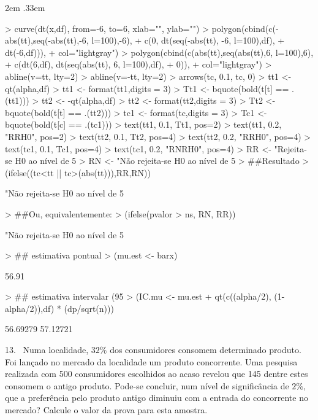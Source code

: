 \documentclass{article}
\newenvironment{ManualExercise}
  {\begin{list}{}{\leftmargin \QuestionIndent
    \partopsep0pt \parsep\parskip \topsep\QuestionBefore
    \itemsep\QuestionBefore \labelwidth2em
    \labelsep.33em
    \usecounter{Question}}}
  {\end{list}}
\begin{document}
\begin{Exercise}
\begin{ManualExercise}
\begin{Schunk}
\begin{Sinput}
> curve(dt(x,df), from=-6, to=6, xlab="", ylab="")
> polygon(cbind(c(-abs(tt),seq(-abs(tt),-6, l=100),-6),
+               c(0, dt(seq(-abs(tt), -6, l=100),df),
+                 dt(-6,df))),
+         col="lightgray")
> polygon(cbind(c(abs(tt),seq(abs(tt),6, l=100),6),
+               c(dt(6,df), dt(seq(abs(tt), 6, l=100),df),
+                 0)),
+         col="lightgray")
> abline(v=tt, lty=2)
> abline(v=-tt, lty=2)
> arrows(tc, 0.1, tc, 0)
> tt1 <- qt(alpha,df)
> tt1 <- format(tt1,digits = 3)
> Tt1 <- bquote(bold(t[t] == .(tt1)))
> tt2 <- -qt(alpha,df)
> tt2 <- format(tt2,digits = 3)
> Tt2 <- bquote(bold(t[t] == .(tt2)))
> tc1 <- format(tc,digits = 3)
> Tc1 <- bquote(bold(t[c] == .(tc1)))
> text(tt1, 0.1, Tt1, pos=2)
> text(tt1, 0.2, "RRH0", pos=2)
> text(tt2, 0.1, Tt2, pos=4)
> text(tt2, 0.2, "RRH0", pos=4)
> text(tc1, 0.1, Tc1, pos=4)
> text(tc1, 0.2, "RNRH0", pos=4)
> RR <- "Rejeita-se H0 ao nível de 5%
> RN <- "Não rejeita-se H0 ao nível de 5%
> ##Resultado
> (ifelse((tc<tt || tc>(abs(tt))),RR,RN))
\end{Sinput}
\begin{Soutput}
[1] "Não rejeita-se H0 ao nível de 5%
\end{Soutput}
\begin{Sinput}
> ##Ou, equivalentemente:
> (ifelse(pvalor > ns, RN, RR))
\end{Sinput}
\begin{Soutput}
[1] "Não rejeita-se H0 ao nível de 5%
\end{Soutput}
\begin{Sinput}
> ## estimativa pontual
> (mu.est <- barx)
\end{Sinput}
\begin{Soutput}
[1] 56.91
\end{Soutput}
\begin{Sinput}
> ## estimativa intervalar (95%
> (IC.mu <- mu.est + qt(c((alpha/2), (1-alpha/2)),df) * (dp/sqrt(n)))
\end{Sinput}
\begin{Soutput}
[1] 56.69279 57.12721
\end{Soutput}
\end{Schunk}

\item[13.~]Numa localidade, $32\%$ dos consumidores consomem determinado produto. Foi lançado no mercado da localidade um produto concorrente. Uma pesquisa realizada com 500 consumidores escolhidos ao acaso revelou que 145 dentre estes consomem o antigo produto. Pode-se concluir, num nível de significância de $2\%,$ que a preferência pelo produto antigo diminuiu com a entrada do concorrente no mercado? Calcule o valor da prova para esta amostra.


\end{ManualExercise}
\end{Exercise}
\end{document}
